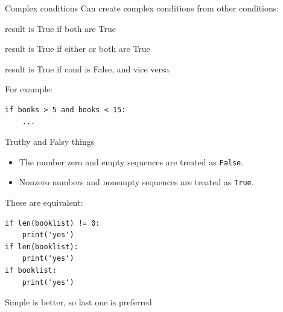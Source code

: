\documentclass[aspectratio=169,usenames,dvipsnames]{beamer}
\begin{document}
\begin{frame}[fragile]{Complex conditions}
    Can create complex conditions from other conditions:
    
    \begin{description}
        \item[cond1 \textcolor{blue}{and} cond2]
            result is True if both are True
        \item[cond1 \textcolor{blue}{or} cond2]
            result is True if either or both are True
        \item[\textcolor{blue}{not} cond]
            result is True if cond is False, and vice versa
    \end{description}

    \pause
    For example:
\begin{lstlisting}
if books > 5 and books < 15:
    ...
\end{lstlisting}

\end{frame}

\begin{frame}[fragile]{Truthy and Falsy things}
\begin{itemize}
    \item The number zero and empty sequences are treated as \texttt{False}.
    \item Nonzero numbers and nonempty sequences are treated as \texttt{True}.
\end{itemize}

These are equivalent:
\begin{lstlisting}
if len(booklist) != 0:
    print('yes')    
if len(booklist):
    print('yes')    
if booklist:
    print('yes')    
\end{lstlisting}

    Simple is better, so last one is preferred
\end{frame}
\end{document}
